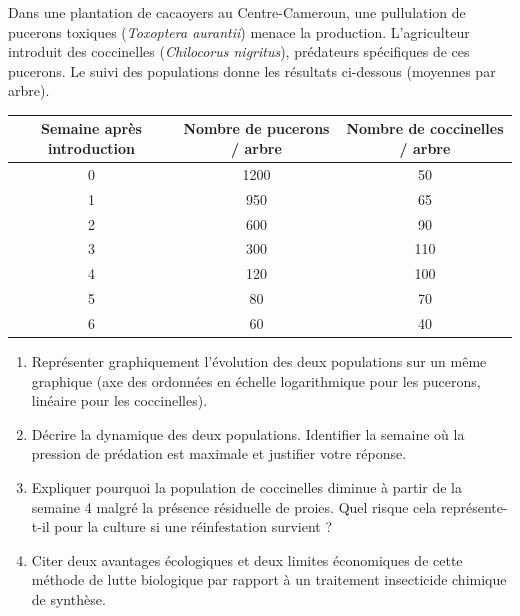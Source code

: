 \documentclass[11pt]{article}
\begin{document}
\begin{exercice}
Dans une plantation de cacaoyers au Centre-Cameroun, une pullulation de pucerons toxiques (\textit{Toxoptera aurantii}) menace la production. L'agriculteur introduit des coccinelles (\textit{Chilocorus nigritus}), prédateurs spécifiques de ces pucerons. Le suivi des populations donne les résultats ci-dessous (moyennes par arbre).

\begin{center}
\begin{tabular}{|c|c|c|}
\hline
\textbf{Semaine après introduction} & \textbf{Nombre de pucerons / arbre} & \textbf{Nombre de coccinelles / arbre} \\
\hline
0 & 1200 & 50 \\
1 & 950 & 65 \\
2 & 600 & 90 \\
3 & 300 & 110 \\
4 & 120 & 100 \\
5 & 80 & 70 \\
6 & 60 & 40 \\
\hline
\end{tabular}
\end{center}

\begin{enumerate}
\item Représenter graphiquement l'évolution des deux populations sur un même graphique (axe des ordonnées en échelle logarithmique pour les pucerons, linéaire pour les coccinelles). 
\item Décrire la dynamique des deux populations. Identifier la semaine où la pression de prédation est maximale et justifier votre réponse.
\item Expliquer pourquoi la population de coccinelles diminue à partir de la semaine 4 malgré la présence résiduelle de proies. Quel risque cela représente-t-il pour la culture si une réinfestation survient ?
\item Citer deux avantages écologiques et deux limites économiques de cette méthode de lutte biologique par rapport à un traitement insecticide chimique de synthèse.
\end{enumerate}
\end{exercice}
\end{document}
